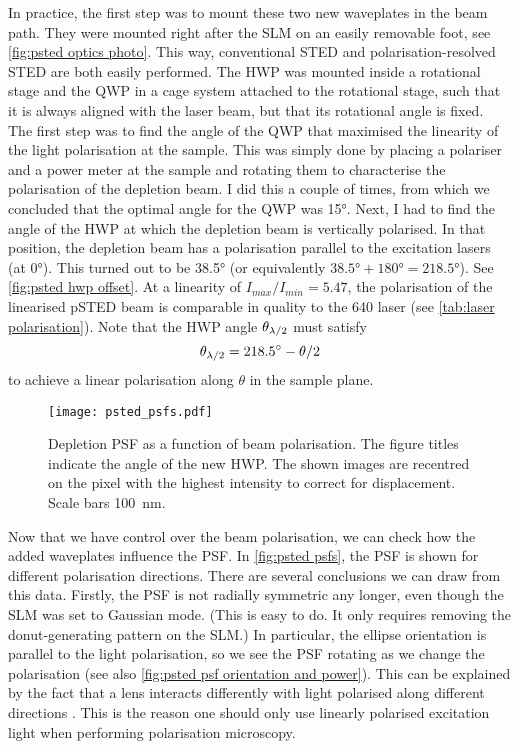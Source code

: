 In practice, the first step was to mount these two new waveplates in the beam path. They were mounted right after the SLM on an easily removable foot, see \autoref{fig:psted optics photo}. This way, conventional STED and polarisation-resolved STED are both easily performed. The HWP was mounted inside a rotational stage and the QWP in a cage system attached to the rotational stage, such that it is always aligned with the laser beam, but that its rotational angle is fixed. The first step was to find the angle of the QWP that maximised the linearity of the light polarisation at the sample. This was simply done by placing a polariser and a power meter at the sample and rotating them to characterise the polarisation of the depletion beam. I did this a couple of times, from which we concluded that the optimal angle for the QWP was \ang{15}. Next, I had to find the angle of the HWP at which the depletion beam is vertically polarised. In that position, the depletion beam has a polarisation parallel to the excitation lasers (at \ang{0}). This turned out to be \ang{38.5} (or equivalently $\ang{38.5}+\ang{180}=\ang{218.5}$). See \autoref{fig:psted hwp offset}. At a linearity of $ I_{max}/I_{min} = 5.47 $, the polarisation of the linearised pSTED beam is comparable in quality to the 640 laser (see \autoref{tab:laser polarisation}). Note that the HWP angle $ \theta_{\lambda/2} $ must satisfy
\begin{equation}
	\theta_{\lambda/2} = \ang{218.5} - \theta/2
\end{equation} 
to achieve a linear polarisation along $ \theta $ in the sample plane.

\begin{figure}
	\centering
	\texttt{[image: psted\_psfs.pdf]}
	\caption{
		Depletion PSF as a function of beam polarisation. The figure titles indicate the angle of the new HWP. The shown images are recentred on the pixel with the highest intensity to correct for displacement. Scale bars 100~nm.
	}
	\label{fig:psted psfs}
\end{figure}

Now that we have control over the beam polarisation, we can check how the added waveplates influence the PSF. In \autoref{fig:psted psfs}, the PSF is shown for different polarisation directions. There are several conclusions we can draw from this data.  Firstly, the PSF is not radially symmetric any longer, even though the SLM was set to Gaussian mode. (This is easy to do. It only requires removing the donut-generating pattern on the SLM.) In particular, the ellipse orientation is parallel to the light polarisation, so we see the PSF rotating as we change the polarisation (see also \autoref{fig:psted psf orientation and power}). This can be explained by the fact that a lens interacts differently with light polarised along different directions \cite{Egner2020}. This is the reason one should only use linearly polarised excitation light when performing polarisation microscopy.

